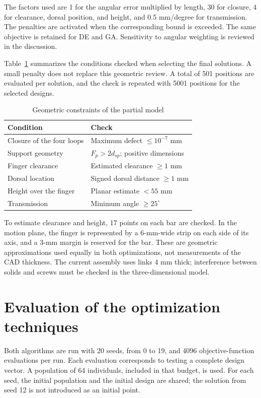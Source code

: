 \documentclass[conference,letterpaper]{IEEEtran}
\begin{document}
The factors used are 1 for the angular error multiplied by length, 30 for closure, 4 for clearance, dorsal position, and height, and 0.5 mm/degree for transmission. The penalties are activated when the corresponding bound is exceeded. The same objective is retained for DE and GA. Sensitivity to angular weighting is reviewed in the discussion.

Table~\ref{tab:restricciones} summarizes the conditions checked when selecting the final solutions. A small penalty does not replace this geometric review. A total of 501 positions are evaluated per solution, and the check is repeated with 5001 positions for the selected designs.

\begin{table}[t]
\caption{Geometric constraints of the partial model}
\label{tab:restricciones}\centering\footnotesize
\begin{tabular}{p{}p{}}\toprule
Condition & Check\\\midrule
Closure of the four loops & Maximum defect $\leq10^{-7}$ mm\\
Support geometry & $F_p>2d_{sp}$; positive dimensions\\
Finger clearance & Estimated clearance $\geq1$ mm\\
Dorsal location & Signed dorsal distance $\geq1$ mm\\
Height over the finger & Planar estimate $<55$ mm\\
Transmission & Minimum angle $\geq25^\circ$\\\bottomrule
\end{tabular}
\end{table}

To estimate clearance and height, 17 points on each bar are checked. In the motion plane, the finger is represented by a 6-mm-wide strip on each side of its axis, and a 3-mm margin is reserved for the bar. These are geometric approximations used equally in both optimizations, not measurements of the CAD thickness. The current assembly uses links 4 mm thick; interference between solids and screws must be checked in the three-dimensional model.

\section{Evaluation of the optimization techniques}
Both algorithms are run with 20 seeds, from 0 to 19, and 4096 objective-function evaluations per run. Each evaluation corresponds to testing a complete design vector. A population of 64 individuals, included in that budget, is used. For each seed, the initial population and the initial design are shared; the solution from seed 12 is not introduced as an initial point.
\end{document}
